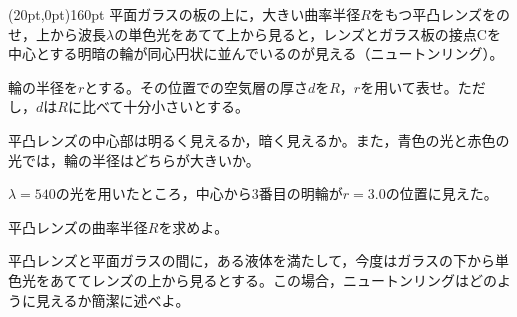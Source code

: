 \hakosyokika
\item
    \begin{mawarikomi}(20pt,0pt){160pt}{}
    平面ガラスの板の上に，大きい曲率半径$R$をもつ平凸レンズをのせ，上から波長$\lambda $の単色光をあてて上から見ると，レンズとガラス板の接点Cを中心とする明暗の輪が同心円状に並んでいるのが見える（ニュートンリング）。
        \begin{Enumerate}
            \item 輪の半径を$r$とする。その位置での空気層の厚さ$d$を$R$，$r$を用いて表せ。ただし，$d$は$R$に比べて十分小さいとする。
            \item 平凸レンズの中心部は明るく見えるか，暗く見えるか。また，青色の光と赤色の光では，輪の半径はどちらが大きいか。
        \end{Enumerate}
    $\lambda = 540$の光を用いたところ，中心から3番目の明輪が$r=3.0$の位置に見えた。
        \begin{Enumerate*}
            \item 平凸レンズの曲率半径$R$を求めよ。
            \item 平凸レンズと平面ガラスの間に，ある液体を満たして，今度はガラスの下から単色光をあててレンズの上から見るとする。この場合，ニュートンリングはどのように見えるか簡潔に述べよ。
        \end{Enumerate*}
    \end{mawarikomi}
